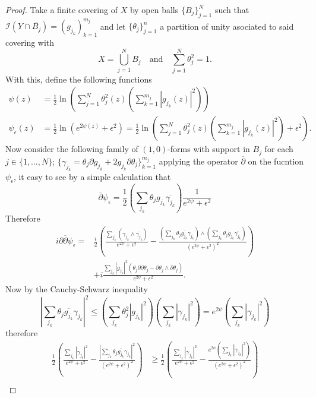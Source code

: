 \documentclass[12pt,twoside,a4paper]{report}
\begin{document}
\begin{proof}
  Take a finite covering of $X$ by open balls $\{B_j\}^N_{j=1}$ such that $\mathcal{I}(Y\cap\overline{B_j})=(g_{j_k})^{m_j}_{k=1}$ and let $\{\theta_j\}^n_{j=1}$ a partition of unity asociated to said covering with
  \[
    X=\bigcup^{N}_{j=1}B_j\quad\text{and}\quad \sum_{j=1}^N \theta_j^2=1.
  \]
  With this, define the following functions
  \begin{align*}
    \psi(z)&=\frac{1}{2}\ln\left(\sum^N_{j=1}\theta^2_j(z)\left(\sum^{m_j}_{k=1}|g_{j_k}(z)|^2\right)\right)\\
    \psi_{\epsilon}(z)&=\frac{1}{2}\ln\left(e^{2\psi(z)}+\epsilon^2\right)=\frac{1}{2}\ln\left(\sum^N_{j=1}\theta^2_j(z)\left(\sum^{m_j}_{k=1}|g_{j_k}(z)|^2\right)+\epsilon^2\right).
  \end{align*}
  Now consider the following family of $(1,0)$-forms with support in $B_j$ for each $j\in\{1,\dots,N\}$; $\{\gamma_{j_k}=\theta_j\partial g_{j_k}+2g_{j_k}\partial\theta_j\}^{m_j}_{k=1}$ applying the operator $\overline\partial$ on the fucntion $\psi_{\epsilon}$, it easy to see by a simple calculation that
  \[
    \overline{\partial}\psi_{\epsilon}=
    \frac{1}{2}\left(\sum_{j_k}\theta_jg_{j_k}\overline{\gamma_{j_k}}\right)\frac{1}{e^{2\psi}+\epsilon^2}
  \]
  Therefore
  \begin{align*}\label{psi-e}
    i\partial\overline{\partial}\psi_{\epsilon}=&\frac{i}{2}\left(\frac{\sum_{j_k}(\gamma_{j_k}\wedge\overline{\gamma_{j_k}})}{e^{2\psi}+\epsilon^2}-\frac{(\sum_{j_k}\theta_j\overline{g_{j_k}}\gamma_{j_k})\wedge(\sum_{j_k}\theta_jg_{j_k}\overline{\gamma_{j_k}})}{(e^{2\psi}+\epsilon^2)^2}\right)\\
    &+i\frac{\sum_{j_k}|g_{j_k}|^2(\theta_j\partial\overline{\partial}\theta_j-\partial\theta_j\wedge\overline{\partial}\theta_j)}
    {e^{2\psi}+\epsilon^2}.
  \end{align*}
  Now by the Cauchy-Schwarz inequality
  \[
  \left| \sum_{j_k}\theta_j\overline{g_{j_k}}\gamma_{j_k} \right|^2
    \leq\left(\sum_{j_k}\theta^2_j|g_{j_k}|^2\right)\left(\sum_{j_k}|\gamma_{j_k}|^2\right)
    =e^{2\psi}\left(\sum_{j_k}|\gamma_{j_k}|^2\right)
  \]
  therefore
  \begin{align*}\label{lowbound-e}
    \frac{1}{2}\left(\frac{\sum_{j_k}|\gamma_{j_k}|^2}{e^{2\psi}+\epsilon^2}
    -\frac{\left|\sum_{j_k}\theta_j\overline{g_{j_k}}\gamma_{j_k} \right|^2}{(e^{2\psi}+\epsilon^2)^2}\right)&\geq
    \frac{1}{2}\left(\frac{\sum_{j_k}|\gamma_{j_k}|^2}{e^{2\psi}+\epsilon^2}
                                                                                                               -\frac{e^{2\psi}\left(\sum_{j_k}|\gamma_{j_k}|^2\right)}{(e^{2\psi}+\epsilon^2)^2}\right)\\

\end{align*}
\end{proof}
\end{document}
